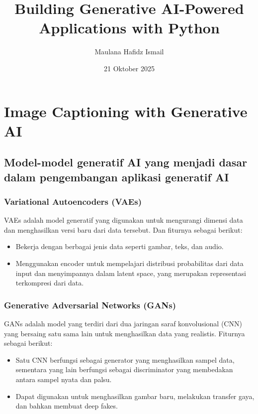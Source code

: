 \documentclass{article}
\title{Building Generative AI-Powered Applications with Python}
\date{21 Oktober 2025}
\author{Maulana Hafidz Ismail}
\begin{document}
\maketitle
\newpage

\tableofcontents
\newpage
{}

\section{Image Captioning with Generative AI}
\subsection{Model-model generatif AI yang menjadi dasar dalam pengembangan aplikasi generatif AI}
\subsubsection{Variational Autoencoders (VAEs)}
VAEs adalah model generatif yang digunakan untuk mengurangi dimensi data dan menghasilkan versi baru dari data tersebut. Dan fiturnya sebagai berikut:
\begin{itemize}
    \item Bekerja dengan berbagai jenis data seperti gambar, teks, dan audio.
    \item Menggunakan encoder untuk mempelajari distribusi probabilitas dari data input dan menyimpannya dalam latent space, yang merupakan representasi terkompresi dari data.
\end{itemize}

\subsubsection{Generative Adversarial Networks (GANs)}
GANs adalah model yang terdiri dari dua jaringan saraf konvolusional (CNN) yang bersaing satu sama lain untuk menghasilkan data yang realistis. Fiturnya sebagai berikut:
\begin{itemize}
    \item Satu CNN berfungsi sebagai generator yang menghasilkan sampel data, sementara yang lain berfungsi sebagai discriminator yang membedakan antara sampel nyata dan palsu.
    \item Dapat digunakan untuk menghasilkan gambar baru, melakukan transfer gaya, dan bahkan membuat deep fakes.
\end{itemize}
\end{document}
